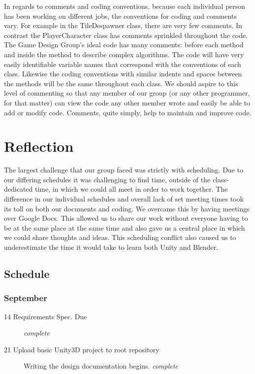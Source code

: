 \documentclass[10pt,letterpaper,oneside,english]{article}
\begin{document}
In regards to comments and coding conventions, because each individual person has been working on different jobs, the conventions for coding and comments vary. For example in the TileDespawner class, there are very few comments. In contrast the PlayerCharacter class has comments sprinkled throughout the code. The Game Design Group’s ideal code has many comments: before each method and inside the method to describe complex algorithms. The code will have very easily identifiable variable names that correspond with the conventions of each class. Likewise the coding conventions with similar indents and spaces between the methods will be the same throughout each class. We should aspire to this level of commenting so that any member of our group (or any other programmer, for that matter) can view the code any other member wrote and easily be able to add or modify code. Comments, quite simply, help to maintain and improve code.

\section{Reflection}
The largest challenge that our group faced was strictly with scheduling. Due to our differing schedules it was challenging to find time, outside of the class-dedicated time, in which we could all meet in order to work together. The difference in our individual schedules and overall lack of set meeting times took its toll on both our documents and coding. We overcame this by having meetings over Google Docs. This allowed us to share our work without everyone having to be at the same place at the same time and also gave us a central place in which we could share thoughts and ideas. This scheduling conflict also caused us to underestimate the time it would take to learn both Unity and Blender.
\subsection{Schedule}
\subsubsection{September}
\begin{description}
	\item [14 Requirements Spec. Due] \textit{complete}
	\item [21 Upload basic Unity3D project to root repository] Writing the design documentation begins. \textit{complete}
\end{description}
\end{document}
